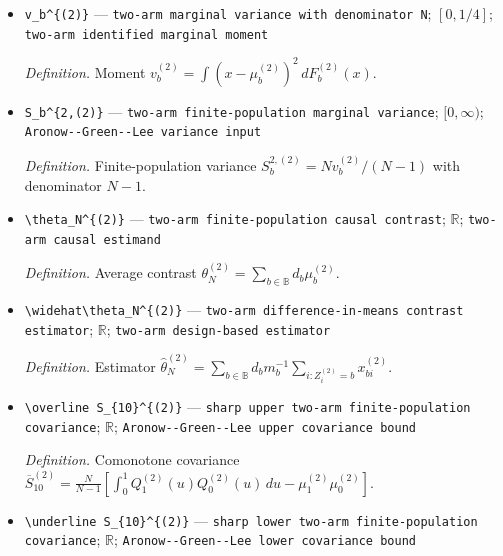\documentclass{article}
\begin{document}
\begin{itemize}
  \par\smallskip\noindent\emph{Definition.} Mean \(\mu_b^{(2)}=\int x\,dF_b^{(2)}(x)\).
  \item \texttt{v\_\allowbreak{}b\textasciicircum{}\{(2)\}\allowbreak{}} --- \texttt{two-\allowbreak{}arm marginal variance with denominator N}; \([0,1/4]\); \texttt{two-\allowbreak{}arm identified marginal moment}
  \par\smallskip\noindent\emph{Definition.} Moment \(v_b^{(2)}=\int(x-\mu_b^{(2)})^2\,dF_b^{(2)}(x)\).
  \item \texttt{S\_\allowbreak{}b\textasciicircum{}\{2,\allowbreak{}(2)\}\allowbreak{}} --- \texttt{two-\allowbreak{}arm finite-\allowbreak{}population marginal variance}; \([0,\infty)\); \texttt{Aronow-\allowbreak{}-\allowbreak{}Green-\allowbreak{}-\allowbreak{}Lee variance input}
  \par\smallskip\noindent\emph{Definition.} Finite-population variance \(S_b^{2,(2)}=Nv_b^{(2)}/(N-1)\) with denominator \(N-1\).
  \item \texttt{\textbackslash{}\allowbreak{}theta\_\allowbreak{}N\textasciicircum{}\{(2)\}\allowbreak{}} --- \texttt{two-\allowbreak{}arm finite-\allowbreak{}population causal contrast}; \(\mathbb R\); \texttt{two-\allowbreak{}arm causal estimand}
  \par\smallskip\noindent\emph{Definition.} Average contrast \(\theta_N^{(2)}=\sum_{b\in\mathbb B}d_b\mu_b^{(2)}\).
  \item \texttt{\textbackslash{}\allowbreak{}widehat\textbackslash{}\allowbreak{}theta\_\allowbreak{}N\textasciicircum{}\{(2)\}\allowbreak{}} --- \texttt{two-\allowbreak{}arm difference-\allowbreak{}in-\allowbreak{}means contrast estimator}; \(\mathbb R\); \texttt{two-\allowbreak{}arm design-\allowbreak{}based estimator}
  \par\smallskip\noindent\emph{Definition.} Estimator \(\widehat\theta_N^{(2)}=\sum_{b\in\mathbb B}d_bm_b^{-1}\sum_{i:Z_i^{(2)}=b}x_{bi}^{(2)}\).
  \item \texttt{\textbackslash{}\allowbreak{}overline S\_\allowbreak{}\{10\}\allowbreak{}\textasciicircum{}\{(2)\}\allowbreak{}} --- \texttt{sharp upper two-\allowbreak{}arm finite-\allowbreak{}population covariance}; \(\mathbb R\); \texttt{Aronow-\allowbreak{}-\allowbreak{}Green-\allowbreak{}-\allowbreak{}Lee upper covariance bound}
  \par\smallskip\noindent\emph{Definition.} Comonotone covariance \(\overline S_{10}^{(2)}=\frac{N}{N-1}[\int_0^1Q_1^{(2)}(u)Q_0^{(2)}(u)\,du-\mu_1^{(2)}\mu_0^{(2)}]\).
  \item \texttt{\textbackslash{}\allowbreak{}underline S\_\allowbreak{}\{10\}\allowbreak{}\textasciicircum{}\{(2)\}\allowbreak{}} --- \texttt{sharp lower two-\allowbreak{}arm finite-\allowbreak{}population covariance}; \(\mathbb R\); \texttt{Aronow-\allowbreak{}-\allowbreak{}Green-\allowbreak{}-\allowbreak{}Lee lower covariance bound}

\end{itemize}
\end{document}
